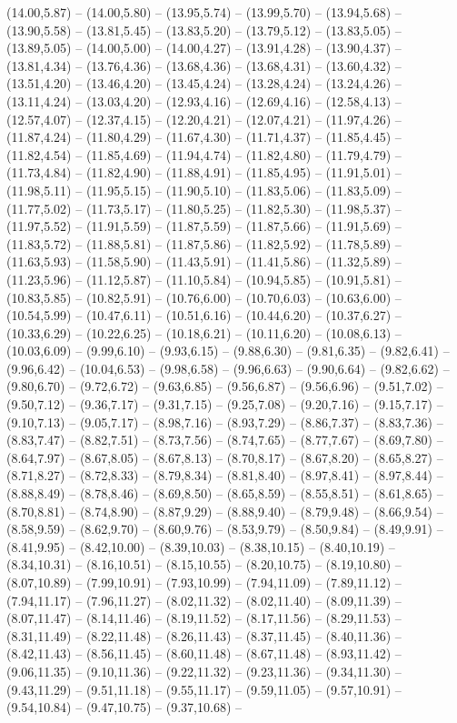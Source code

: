 \expandafter\def\csname geo:gebiet:RUS\endcsname{
  (14.00,5.87) -- (14.00,5.80) -- (13.95,5.74) -- (13.99,5.70) -- (13.94,5.68) -- (13.90,5.58) -- (13.81,5.45) -- (13.83,5.20) -- (13.79,5.12) -- (13.83,5.05) -- (13.89,5.05) -- (14.00,5.00) -- (14.00,4.27) -- (13.91,4.28) -- (13.90,4.37) -- (13.81,4.34) -- (13.76,4.36) -- (13.68,4.36) -- (13.68,4.31) -- (13.60,4.32) -- (13.51,4.20) -- (13.46,4.20) -- (13.45,4.24) -- (13.28,4.24) -- (13.24,4.26) -- (13.11,4.24) -- (13.03,4.20) -- (12.93,4.16) -- (12.69,4.16) -- (12.58,4.13) -- (12.57,4.07) -- (12.37,4.15) -- (12.20,4.21) -- (12.07,4.21) -- (11.97,4.26) -- (11.87,4.24) -- (11.80,4.29) -- (11.67,4.30) -- (11.71,4.37) -- (11.85,4.45) -- (11.82,4.54) -- (11.85,4.69) -- (11.94,4.74) -- (11.82,4.80) -- (11.79,4.79) -- (11.73,4.84) -- (11.82,4.90) -- (11.88,4.91) -- (11.85,4.95) -- (11.91,5.01) -- (11.98,5.11) -- (11.95,5.15) -- (11.90,5.10) -- (11.83,5.06) -- (11.83,5.09) -- (11.77,5.02) -- (11.73,5.17) -- (11.80,5.25) -- (11.82,5.30) -- (11.98,5.37) -- (11.97,5.52) -- (11.91,5.59) -- (11.87,5.59) -- (11.87,5.66) -- (11.91,5.69) -- (11.83,5.72) -- (11.88,5.81) -- (11.87,5.86) -- (11.82,5.92) -- (11.78,5.89) -- (11.63,5.93) -- (11.58,5.90) -- (11.43,5.91) -- (11.41,5.86) -- (11.32,5.89) -- (11.23,5.96) -- (11.12,5.87) -- (11.10,5.84) -- (10.94,5.85) -- (10.91,5.81) -- (10.83,5.85) -- (10.82,5.91) -- (10.76,6.00) -- (10.70,6.03) -- (10.63,6.00) -- (10.54,5.99) -- (10.47,6.11) -- (10.51,6.16) -- (10.44,6.20) -- (10.37,6.27) -- (10.33,6.29) -- (10.22,6.25) -- (10.18,6.21) -- (10.11,6.20) -- (10.08,6.13) -- (10.03,6.09) -- (9.99,6.10) -- (9.93,6.15) -- (9.88,6.30) -- (9.81,6.35) -- (9.82,6.41) -- (9.96,6.42) -- (10.04,6.53) -- (9.98,6.58) -- (9.96,6.63) -- (9.90,6.64) -- (9.82,6.62) -- (9.80,6.70) -- (9.72,6.72) -- (9.63,6.85) -- (9.56,6.87) -- (9.56,6.96) -- (9.51,7.02) -- (9.50,7.12) -- (9.36,7.17) -- (9.31,7.15) -- (9.25,7.08) -- (9.20,7.16) -- (9.15,7.17) -- (9.10,7.13) -- (9.05,7.17) -- (8.98,7.16) -- (8.93,7.29) -- (8.86,7.37) -- (8.83,7.36) -- (8.83,7.47) -- (8.82,7.51) -- (8.73,7.56) -- (8.74,7.65) -- (8.77,7.67) -- (8.69,7.80) -- (8.64,7.97) -- (8.67,8.05) -- (8.67,8.13) -- (8.70,8.17) -- (8.67,8.20) -- (8.65,8.27) -- (8.71,8.27) -- (8.72,8.33) -- (8.79,8.34) -- (8.81,8.40) -- (8.97,8.41) -- (8.97,8.44) -- (8.88,8.49) -- (8.78,8.46) -- (8.69,8.50) -- (8.65,8.59) -- (8.55,8.51) -- (8.61,8.65) -- (8.70,8.81) -- (8.74,8.90) -- (8.87,9.29) -- (8.88,9.40) -- (8.79,9.48) -- (8.66,9.54) -- (8.58,9.59) -- (8.62,9.70) -- (8.60,9.76) -- (8.53,9.79) -- (8.50,9.84) -- (8.49,9.91) -- (8.41,9.95) -- (8.42,10.00) -- (8.39,10.03) -- (8.38,10.15) -- (8.40,10.19) -- (8.34,10.31) -- (8.16,10.51) -- (8.15,10.55) -- (8.20,10.75) -- (8.19,10.80) -- (8.07,10.89) -- (7.99,10.91) -- (7.93,10.99) -- (7.94,11.09) -- (7.89,11.12) -- (7.94,11.17) -- (7.96,11.27) -- (8.02,11.32) -- (8.02,11.40) -- (8.09,11.39) -- (8.07,11.47) -- (8.14,11.46) -- (8.19,11.52) -- (8.17,11.56) -- (8.29,11.53) -- (8.31,11.49) -- (8.22,11.48) -- (8.26,11.43) -- (8.37,11.45) -- (8.40,11.36) -- (8.42,11.43) -- (8.56,11.45) -- (8.60,11.48) -- (8.67,11.48) -- (8.93,11.42) -- (9.06,11.35) -- (9.10,11.36) -- (9.22,11.32) -- (9.23,11.36) -- (9.34,11.30) -- (9.43,11.29) -- (9.51,11.18) -- (9.55,11.17) -- (9.59,11.05) -- (9.57,10.91) -- (9.54,10.84) -- (9.47,10.75) -- (9.37,10.68) -- }
